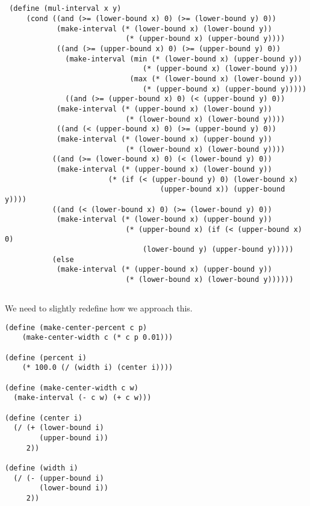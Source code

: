 \documentclass{article}
\begin{document}
\subsection{}
\begin{verbatim}
 (define (mul-interval x y) 
     (cond ((and (>= (lower-bound x) 0) (>= (lower-bound y) 0)) 
            (make-interval (* (lower-bound x) (lower-bound y)) 
                            (* (upper-bound x) (upper-bound y))))
            ((and (>= (upper-bound x) 0) (>= (upper-bound y) 0)) 
              (make-interval (min (* (lower-bound x) (upper-bound y)) 
                                (* (upper-bound x) (lower-bound y))) 
                             (max (* (lower-bound x) (lower-bound y)) 
                                (* (upper-bound x) (upper-bound y)))))
              ((and (>= (upper-bound x) 0) (< (upper-bound y) 0)) 
            (make-interval (* (upper-bound x) (lower-bound y)) 
                            (* (lower-bound x) (lower-bound y))))
            ((and (< (upper-bound x) 0) (>= (upper-bound y) 0)) 
            (make-interval (* (lower-bound x) (upper-bound y)) 
                            (* (lower-bound x) (lower-bound y))))
           ((and (>= (lower-bound x) 0) (< (lower-bound y) 0)) 
            (make-interval (* (upper-bound x) (lower-bound y)) 
                        (* (if (< (upper-bound y) 0) (lower-bound x) 
                                    (upper-bound x)) (upper-bound y)))) 
           ((and (< (lower-bound x) 0) (>= (lower-bound y) 0)) 
            (make-interval (* (lower-bound x) (upper-bound y)) 
                            (* (upper-bound x) (if (< (upper-bound x) 0) 
                                (lower-bound y) (upper-bound y))))) 
           (else 
            (make-interval (* (upper-bound x) (upper-bound y))
                            (* (lower-bound x) (lower-bound y))))))
\end{verbatim}

\subsection{}
We need to slightly redefine how we approach this.
\begin{verbatim}
(define (make-center-percent c p)
    (make-center-width c (* c p 0.01)))

(define (percent i)
    (* 100.0 (/ (width i) (center i))))
    
(define (make-center-width c w)
  (make-interval (- c w) (+ c w)))

(define (center i)
  (/ (+ (lower-bound i)
        (upper-bound i))
     2))

(define (width i)
  (/ (- (upper-bound i)
        (lower-bound i))
     2))
\end{verbatim}
\end{document}
